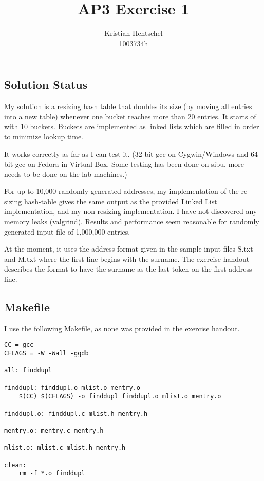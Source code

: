 \documentclass{article}
\title{AP3 Exercise 1}
\author{Kristian Hentschel\\1003734h}
\begin{document}
\maketitle

\subsection{Solution Status}
My solution is a resizing hash table that doubles its size (by moving all entries into a new table) whenever one bucket reaches more than 20 entries. It starts of with 10 buckets. Buckets are implemented as linked lists which are filled in order to minimize lookup time.

It works correctly as far as I can test it. (32-bit gcc on Cygwin/Windows and 64-bit gcc on Fedora in Virtual Box. Some testing has been done on sibu, more needs to be done on the lab machines.)

For up to 10,000 randomly generated addresses, my implementation of the re-sizing hash-table gives the same output as the provided Linked List implementation, and my non-resizing implementation. I have not discovered any memory leaks (valgrind). Results and performance seem reasonable for randomly generated input file of 1,000,000 entries.

At the moment, it uses the address format given in the sample input files S.txt and M.txt where the first line begins with the surname. The exercise handout describes the format to have the surname as the last token on the first address line.

\subsection{Makefile}
I use the following Makefile, as none was provided in the exercise handout.

\begin{lstlisting}
CC = gcc
CFLAGS = -W -Wall -ggdb

all: finddupl

finddupl: finddupl.o mlist.o mentry.o
	$(CC) $(CFLAGS) -o finddupl finddupl.o mlist.o mentry.o

finddupl.o: finddupl.c mlist.h mentry.h

mentry.o: mentry.c mentry.h

mlist.o: mlist.c mlist.h mentry.h

clean:
	rm -f *.o finddupl
\end{lstlisting}
\end{document}
